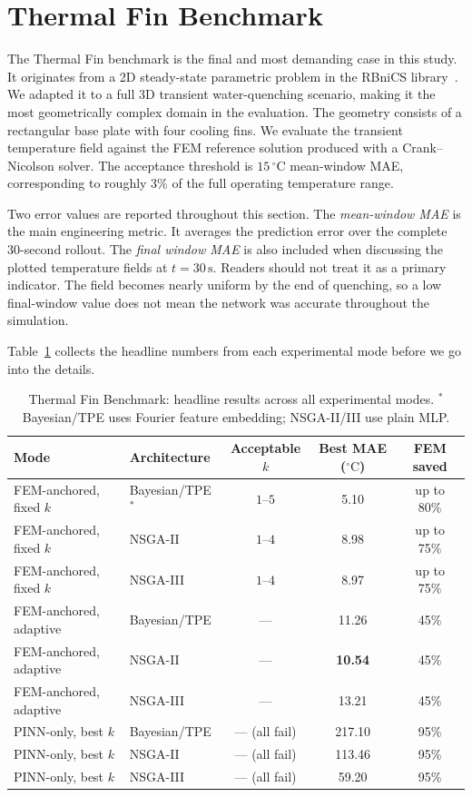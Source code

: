 \section{Thermal Fin Benchmark}
\label{sec:results_thermal_fin}

The Thermal Fin benchmark is the final and most demanding case in this study.
It originates from a 2D steady-state parametric problem in the RBniCS
library~\cite{rozza2008}.
We adapted it to a full 3D transient water-quenching scenario, making it the
most geometrically complex domain in the evaluation.
The geometry consists of a rectangular base plate with four cooling fins.
We evaluate the transient temperature field against the FEM reference solution
produced with a Crank--Nicolson solver.
The acceptance threshold is $15\,^\circ\mathrm{C}$ mean-window MAE,
corresponding to roughly 3\% of the full operating temperature range.

Two error values are reported throughout this section. The
\emph{mean-window MAE} is the main engineering metric. It averages the
prediction error over the complete 30-second rollout. The \emph{final window
MAE} is also included when discussing the plotted temperature fields at
$t=30\,\mathrm{s}$. Readers should not treat it as a primary indicator. The
field becomes nearly uniform by the end of quenching, so a low final-window
value does not mean the network was accurate throughout the simulation.

Table~\ref{tab:tf_overview} collects the headline numbers from each
experimental mode before we go into the details.

\begin{table}[H]
\centering
\caption{Thermal Fin Benchmark: headline results across all experimental modes.
$^*$Bayesian/TPE uses Fourier feature embedding; NSGA-II/III use plain MLP.}
\label{tab:tf_overview}
\small
\begin{tabular}{llccc}
\toprule
Mode & Architecture & Acceptable $k$ & Best MAE ($^\circ\mathrm{C}$) & FEM saved \\
\midrule
FEM-anchored, fixed $k$ & Bayesian/TPE$^*$ & $1$--$5$ &  5.10 & up to 80\% \\
FEM-anchored, fixed $k$ & NSGA-II      & $1$--$4$ &  8.98 & up to 75\% \\
FEM-anchored, fixed $k$ & NSGA-III     & $1$--$4$ &  8.97 & up to 75\% \\
\midrule
FEM-anchored, adaptive  & Bayesian/TPE & —        & 11.26 & 45\% \\
FEM-anchored, adaptive  & NSGA-II      & —        & \textbf{10.54} & 45\% \\
FEM-anchored, adaptive  & NSGA-III     & —        & 13.21 & 45\% \\
\midrule
PINN-only, best $k$ & Bayesian/TPE & — (all fail) & 217.10 & 95\% \\
PINN-only, best $k$ & NSGA-II      & — (all fail) & 113.46 & 95\% \\
PINN-only, best $k$ & NSGA-III     & — (all fail) &  59.20 & 95\% \\
\bottomrule
\end{tabular}
\end{table}

